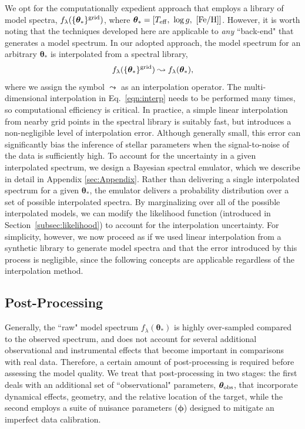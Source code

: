 \documentclass[iop,floatfix,numberedappendix,twocolappendix]{emulateapj}
\newcommand{\flam}{f_\lambda}
\newcommand{\vt}{ {\bm \theta}}
\newcommand{\vp}{ {\bm \phi}}
\begin{document}
We opt for the computationally expedient approach that employs a library of model spectra, 
$\flam(\{\vt_{\ast}\}^{\rm grid})$, where $\vt_{\ast} = [T_{\rm eff}, \,\, \log{g}, \,\, 
[{\rm Fe/H}]]$.  However, it is worth noting that the techniques developed here are applicable to 
{\it any} ``back-end" that generates a model spectrum.  In our adopted approach, the model spectrum 
for an arbitrary $\vt_{\ast}$ is interpolated from a spectral library,
\begin{equation} \label{eqn:interp} 
\flam(\{\vt_{\ast}\}^{\rm grid}) \leadsto \flam(\vt_{\ast}), 
\end{equation} 
where we assign the symbol $\leadsto$ as an interpolation operator.  The multi-dimensional
interpolation in Eq.~\ref{eqn:interp} needs to be performed many times, so computational efficiency
is critical.  In practice, a simple linear interpolation from nearby grid points in the spectral
library is suitably fast, but introduces a non-negligible level of interpolation error. Although
generally small, this error can significantly bias the inference of stellar parameters
when the signal-to-noise of the data is sufficiently high. To account for the uncertainty in a given
interpolated spectrum, we design a Bayesian spectral emulator, which we describe in detail in
Appendix \ref{sec:Appendix}. Rather than delivering a single interpolated spectrum for a given
$\vt_\ast$, the emulator delivers a probability distribution over a set of possible interpolated
spectra. By marginalizing over all of the possible interpolated models, we can modify the likelihood
function (introduced in Section~\ref{subsec:likelihood}) to account for the interpolation uncertainty. For
simplicity, however, we now proceed as if we used linear interpolation from a synthetic library to
generate model spectra and that the error introduced by this process is negligible, since the
following concepts are applicable regardless of the interpolation method. 

\subsection{Post-Processing} \label{subsec:postprocess}

Generally, the ``raw" model spectrum $\flam(\vt_{\ast})$ is highly over-sampled compared to the 
observed spectrum, and does not account for several additional observational and instrumental 
effects that become important in comparisons with real data.  Therefore, a certain amount of 
post-processing is required before assessing the model quality.  We treat that post-processing in 
two stages: the first deals with an additional set of ``observational" parameters, $\vt_{\rm obs}$, 
that incorporate dynamical effects, geometry, and the relative location of the target, while the 
second employs a suite of nuisance parameters ($\vp$) designed to mitigate an imperfect 
data calibration.
\end{document}
